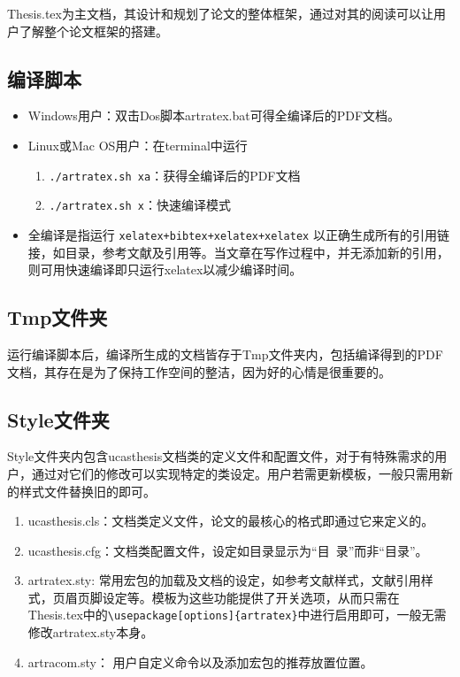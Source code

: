 Thesis.tex为主文档，其设计和规划了论文的整体框架，通过对其的阅读可以让用户了解整个论文框架的搭建。

\subsection{编译脚本}

\begin{itemize}
    \item Windows用户：双击Dos脚本artratex.bat可得全编译后的PDF文档。
    \item Linux或Mac OS用户：在terminal中运行
        \begin{enumerate}
            \item \verb|./artratex.sh xa|：获得全编译后的PDF文档
            \item \verb|./artratex.sh x|：快速编译模式
        \end{enumerate}
    \item 全编译是指运行 \verb|xelatex+bibtex+xelatex+xelatex| 以正确生成所有的引用链接，如目录，参考文献及引用等。当文章在写作过程中，并无添加新的引用，则可用快速编译即只运行xelatex以减少编译时间。
\end{itemize}


\subsection{Tmp文件夹}

运行编译脚本后，编译所生成的文档皆存于Tmp文件夹内，包括编译得到的PDF文档，其存在是为了保持工作空间的整洁，因为好的心情是很重要的。

\subsection{Style文件夹}

Style文件夹内包含ucasthesis文档类的定义文件和配置文件，对于有特殊需求的用户，通过对它们的修改可以实现特定的类设定。用户若需更新模板，一般只需用新的样式文件替换旧的即可。

\begin{enumerate}
  \item ucasthesis.cls：文档类定义文件，论文的最核心的格式即通过它来定义的。
  \item ucasthesis.cfg：文档类配置文件，设定如目录显示为“目~录”而非“目录”。
  \item artratex.sty: 常用宏包的加载及文档的设定，如参考文献样式，文献引用样式，页眉页脚设定等。模板为这些功能提供了开关选项，从而只需在Thesis.tex中的\verb+\usepackage[options]{artratex}+中进行启用即可，一般无需修改artratex.sty本身。
  \item artracom.sty： 用户自定义命令以及添加宏包的推荐放置位置。
\end{enumerate}

